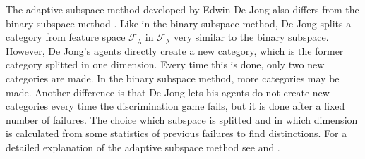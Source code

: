 The adaptive subspace method developed by Edwin De Jong also differs from the binary subspace method \citep{dejongvogt:1998,dejong:2000}. Like in the binary subspace method, De Jong splits a category from feature space ${\mathcal F}_\lambda$ in ${\mathcal F}_{\lambda}$ very similar to the binary subspace. However, De Jong's agents directly create a new category, which is the former category splitted in one dimension. Every time this is done, only two new categories are made. In the binary subspace method, more categories may be made. Another difference is that De Jong lets his agents do not create new categories every time the discrimination game fails, but it is done after a fixed number of failures. The choice which subspace is splitted and in which dimension is calculated from some statistics of previous failures to find distinctions. For a detailed explanation of the adaptive subspace method see \citealt{dejongvogt:1998} and \citealt{dejong:2000}.

